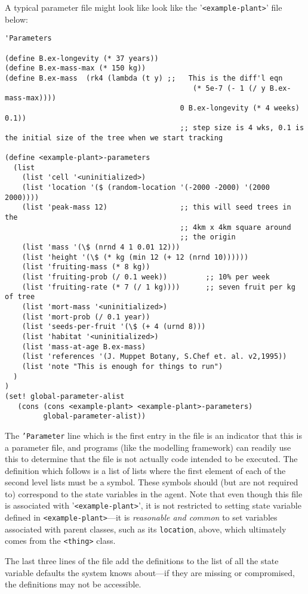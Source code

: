 A typical parameter file might look
like look like the '\texttt{<example-plant>}' file below:
\begin{verbatim}
'Parameters

(define B.ex-longevity (* 37 years))
(define B.ex-mass-max (* 150 kg))
(define B.ex-mass  (rk4 (lambda (t y) ;;   This is the diff'l eqn
											(* 5e-7 (- 1 (/ y B.ex-mass-max))))
										 0 B.ex-longevity (* 4 weeks) 0.1))
										 ;; step size is 4 wks, 0.1 is the initial size of the tree when we start tracking

(define <example-plant>-parameters
  (list
    (list 'cell '<uninitialized>)
    (list 'location '($ (random-location '(-2000 -2000) '(2000 2000))))
    (list 'peak-mass 12)                 ;; this will seed trees in the
                                         ;; 4km x 4km square around
                                         ;; the origin
    (list 'mass '(\$ (nrnd 4 1 0.01 12)))
    (list 'height '(\$ (* kg (min 12 (+ 12 (nrnd 10))))))
    (list 'fruiting-mass (* 8 kg))
    (list 'fruiting-prob (/ 0.1 week))         ;; 10% per week
    (list 'fruiting-rate (* 7 (/ 1 kg))))      ;; seven fruit per kg of tree
    (list 'mort-mass '<uninitialized>)
    (list 'mort-prob (/ 0.1 year))
    (list 'seeds-per-fruit '(\$ (+ 4 (urnd 8)))
    (list 'habitat '<uninitialized>)
    (list 'mass-at-age B.ex-mass)
    (list 'references '(J. Muppet Botany, S.Chef et. al. v2,1995))
    (list 'note "This is enough for things to run")
  )
)
(set! global-parameter-alist 
   (cons (cons <example-plant> <example-plant>-parameters) 
         global-parameter-alist))

\end{verbatim}
The \texttt{'Parameter} line which is the first entry in the file is
an indicator that this is a parameter file, and \Scheme
programs (like the modelling framework) can readily use this to
determine that the file is not actually code intended to be executed.
The definition which follows is a list of lists where the first
element of each of the second level lists must be a symbol.  These
symbols should (but are not required to) correspond to the state
variables in the agent. Note that even though this file is associated
with '\texttt{<example-plant>}', it is not restricted to setting state
variable defined in \texttt{<example-plant>}---it is \emph{reasonable
  and common} to set variables associated with parent classes, such as
its \texttt{location}, above, which ultimately comes from the \texttt{<thing>}
class.

The last three lines of the file add the definitions to the list of
all the state variable defaults the system knows about---if they are
missing or compromised, the definitions may not be accessible.

